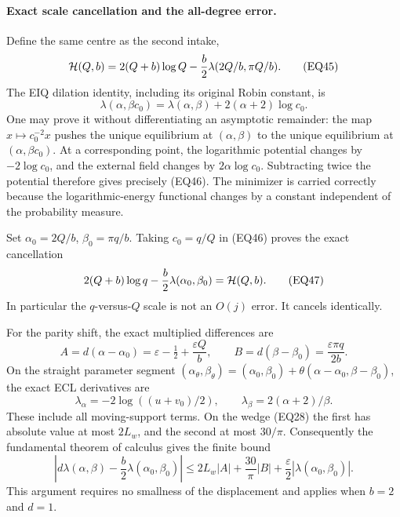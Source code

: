 \documentclass[11pt,a4paper]{article}
\begin{document}
\paragraph{Exact scale cancellation and the all-degree error.}
Define the same centre as the second intake,
\[
 {\cal H}(Q,b)=2(Q+b)\log Q
      -\frac b2\lambda(2Q/b,\pi Q/b).
\tag{EQ45}
\]
The EIQ dilation identity, including its original Robin constant, is
\[
 \lambda(\alpha,\beta c_0)
   =\lambda(\alpha,\beta)+2(\alpha+2)\log c_0.
\tag{EQ46}
\]
One may prove it without differentiating an asymptotic remainder:
the map \(x\mapsto c_0^{-2}x\) pushes the unique equilibrium at
\((\alpha,\beta)\) to the unique equilibrium at \((\alpha,\beta c_0)\).
At a corresponding point, the logarithmic potential changes by
\(-2\log c_0\), and the external field changes by \(2\alpha\log c_0\).
Subtracting twice the potential therefore gives precisely (EQ46).
The minimizer is carried correctly because the logarithmic-energy
functional changes by a constant independent of the probability measure.

Set
\(\alpha_0=2Q/b\), \(\beta_0=\pi q/b\).
Taking \(c_0=q/Q\) in (EQ46) proves the exact cancellation
\[
 2(Q+b)\log q-\frac b2\lambda(\alpha_0,\beta_0)
       ={\cal H}(Q,b).
\tag{EQ47}
\]
In particular the \(q\)-versus-\(Q\) scale is not an \(O(j)\) error.
It cancels identically.

For the parity shift, the exact multiplied differences are
\[
 A=d(\alpha-\alpha_0)=\varepsilon-\tfrac12+\frac{\varepsilon Q}{b},
 \qquad
 B=d(\beta-\beta_0)=\frac{\varepsilon\pi q}{2b}.
\tag{EQ48}
\]
On the straight parameter segment
\((\alpha_\theta,\beta_\theta)
=(\alpha_0,\beta_0)+\theta(\alpha-\alpha_0,\beta-\beta_0)\),
the exact ECL derivatives are
\[
 \lambda_\alpha=-2\log((u+v_0)/2),\qquad
 \lambda_\beta=2(\alpha+2)/\beta.
\tag{EQ49}
\]
These include all moving-support terms.  On the wedge (EQ28) the first
has absolute value at most \(2L_w\), and the second at most \(30/\pi\).
Consequently the fundamental theorem of calculus gives the finite bound
\[
 \left|d\lambda(\alpha,\beta)-\frac b2\lambda(\alpha_0,\beta_0)\right|
 \le 2L_w|A|+\frac{30}{\pi}|B|
                  +\frac{\varepsilon}{2}|\lambda(\alpha_0,\beta_0)|.
\tag{EQ50}
\]
This argument requires no smallness of the displacement and applies
when \(b=2\) and \(d=1\).
\end{document}

